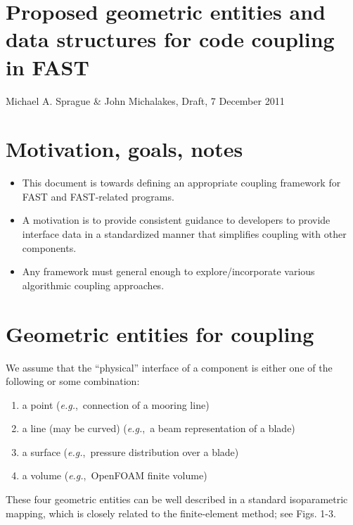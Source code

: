 \documentclass[11pt]{article}
\newcommand{\eg}{\textit{e.g.},~}
\begin{document}
  


\section*{Proposed geometric entities and data structures for code coupling
in FAST}

Michael A. Sprague \& John Michalakes, Draft, 7 December 2011

\section{Motivation, goals, notes}

\begin{itemize}

\item This document is towards defining an appropriate coupling framework
for FAST and FAST-related programs.  

\item A motivation is to provide consistent guidance to developers to
provide interface data in a standardized manner that simplifies coupling
with other components.

\item Any framework must general enough to explore/incorporate various
algorithmic coupling approaches.

\end{itemize}

\section{Geometric entities for coupling}

We assume that the ``physical'' interface of a component is either one of
the following or some combination:

\begin{enumerate} 
\item a point  (\eg  connection of a mooring line)

\item a line (may be curved) (\eg a beam representation of a blade)

\item a surface (\eg pressure distribution over a blade)

\item a volume (\eg OpenFOAM finite volume)

\end{enumerate}

These four geometric entities can be well described in a standard
isoparametric mapping, which is closely related to the finite-element
method; see Figs. 1-3.  
\end{document}
